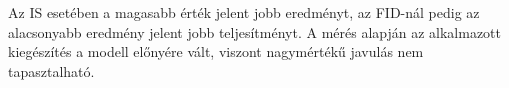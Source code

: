 



\noindent Az IS esetében a magasabb érték jelent jobb eredményt, az FID-nál pedig az alacsonyabb eredmény jelent jobb teljesítményt. A mérés alapján az alkalmazott kiegészítés a modell előnyére vált, viszont nagymértékű javulás nem tapasztalható.

